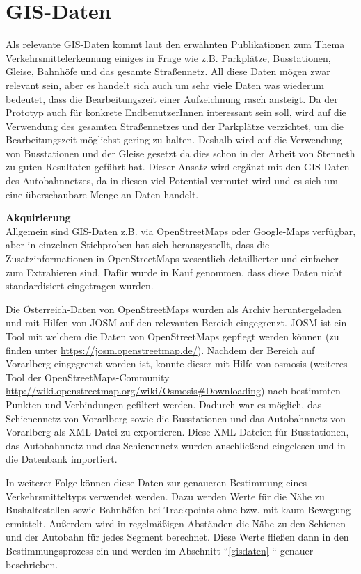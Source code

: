 
\section{GIS-Daten}
Als relevante GIS-Daten kommt laut den erwähnten Publikationen zum Thema Verkehrsmittelerkennung einiges in Frage wie z.B. Parkplätze, Busstationen, Gleise, Bahnhöfe und das gesamte Straßennetz. All diese Daten mögen zwar relevant sein, aber es handelt sich auch um sehr viele Daten was wiederum bedeutet, dass die Bearbeitungszeit einer Aufzeichnung rasch ansteigt. Da der Prototyp auch für konkrete EndbenutzerInnen interessant sein soll, wird auf die Verwendung des gesamten Straßennetzes und der Parkplätze verzichtet, um die Bearbeitungszeit möglichst gering zu halten. Deshalb wird auf die Verwendung von Busstationen und der Gleise gesetzt da dies schon in der Arbeit von Stenneth \cite{stenneth_transportation_2011} zu guten Resultaten geführt hat. Dieser Ansatz wird ergänzt mit den GIS-Daten des Autobahnnetzes, da in diesen viel Potential vermutet wird und es sich um eine überschaubare Menge an Daten handelt.

\textbf{Akquirierung}\\
Allgemein sind GIS-Daten z.B. via OpenStreetMaps oder Google-Maps verfügbar, aber in einzelnen Stichproben hat sich herausgestellt, dass die Zusatzinformationen in OpenStreetMaps wesentlich detaillierter und einfacher zum Extrahieren sind. Dafür wurde in Kauf genommen, dass diese Daten nicht standardisiert eingetragen wurden.

Die Österreich-Daten von OpenStreetMaps wurden als Archiv heruntergeladen und mit Hilfen von JOSM auf den relevanten Bereich eingegrenzt. JOSM ist ein Tool mit welchem die Daten von OpenStreetMaps gepflegt werden können (zu finden unter \url{https://josm.openstreetmap.de/}). Nachdem der Bereich auf Vorarlberg eingegrenzt worden ist, konnte dieser mit Hilfe von osmosis (weiteres Tool der OpenStreetMaps-Community \url{http://wiki.openstreetmap.org/wiki/Osmosis#Downloading}) nach bestimmten Punkten und Verbindungen gefiltert werden. Dadurch war es möglich, das Schienennetz von Vorarlberg sowie die Busstationen und das Autobahnnetz von Vorarlberg als XML-Datei zu exportieren. Diese XML-Dateien für Busstationen, das Autobahnnetz und das Schienennetz wurden anschließend eingelesen und in die Datenbank importiert. 

In weiterer Folge können diese Daten zur genaueren Bestimmung eines Verkehrsmitteltyps verwendet werden. Dazu werden Werte für die Nähe zu Bushaltestellen sowie Bahnhöfen bei Trackpoints ohne bzw. mit kaum Bewegung ermittelt. Außerdem wird in regelmäßigen Abständen die Nähe zu den Schienen und der Autobahn für jedes Segment berechnet. Diese Werte fließen dann in den Bestimmungsprozess ein und werden im Abschnitt ``\ref{gisdaten} `` genauer beschrieben.

